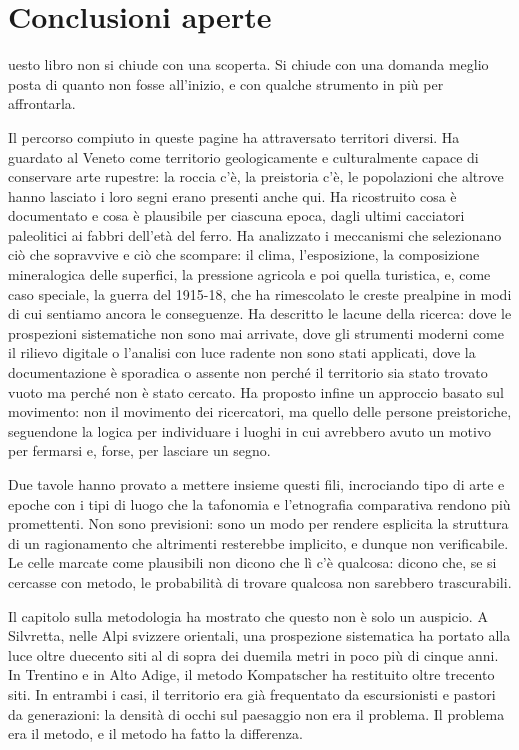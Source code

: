 \chapter{Conclusioni aperte}
\label{cap:conclusioni}

uesto libro non si chiude con una scoperta. Si chiude con una domanda meglio posta di quanto non fosse all'inizio, e con qualche strumento in più per affrontarla.

Il percorso compiuto in queste pagine ha attraversato territori diversi. Ha guardato al Veneto come territorio geologicamente e culturalmente capace di conservare arte rupestre: la roccia c'è, la preistoria c'è, le popolazioni che altrove hanno lasciato i loro segni erano presenti anche qui. Ha ricostruito cosa è documentato e cosa è plausibile per ciascuna epoca, dagli ultimi cacciatori paleolitici ai fabbri dell'età del ferro. Ha analizzato i meccanismi che selezionano ciò che sopravvive e ciò che scompare: il clima, l'esposizione, la composizione mineralogica delle superfici, la pressione agricola e poi quella turistica, e, come caso speciale, la guerra del 1915-18, che ha rimescolato le creste prealpine in modi di cui sentiamo ancora le conseguenze. Ha descritto le lacune della ricerca: dove le prospezioni sistematiche non sono mai arrivate, dove gli strumenti moderni come il rilievo digitale o l'analisi con luce radente non sono stati applicati, dove la documentazione è sporadica o assente non perché il territorio sia stato trovato vuoto ma perché non è stato cercato. Ha proposto infine un approccio basato sul movimento: non il movimento dei ricercatori, ma quello delle persone preistoriche, seguendone la logica per individuare i luoghi in cui avrebbero avuto un motivo per fermarsi e, forse, per lasciare un segno.

Due tavole hanno provato a mettere insieme questi fili, incrociando tipo di arte e epoche con i tipi di luogo che la tafonomia e l'etnografia comparativa rendono più promettenti. Non sono previsioni: sono un modo per rendere esplicita la struttura di un ragionamento che altrimenti resterebbe implicito, e dunque non verificabile. Le celle marcate come plausibili non dicono che lì c'è qualcosa: dicono che, se si cercasse con metodo, le probabilità di trovare qualcosa non sarebbero trascurabili.

Il capitolo sulla metodologia ha mostrato che questo non è solo un auspicio. A Silvretta, nelle Alpi svizzere orientali, una prospezione sistematica ha portato alla luce oltre duecento siti al di sopra dei duemila metri in poco più di cinque anni. In Trentino e in Alto Adige, il metodo Kompatscher ha restituito oltre trecento siti. In entrambi i casi, il territorio era già frequentato da escursionisti e pastori da generazioni: la densità di occhi sul paesaggio non era il problema. Il problema era il metodo, e il metodo ha fatto la differenza.

